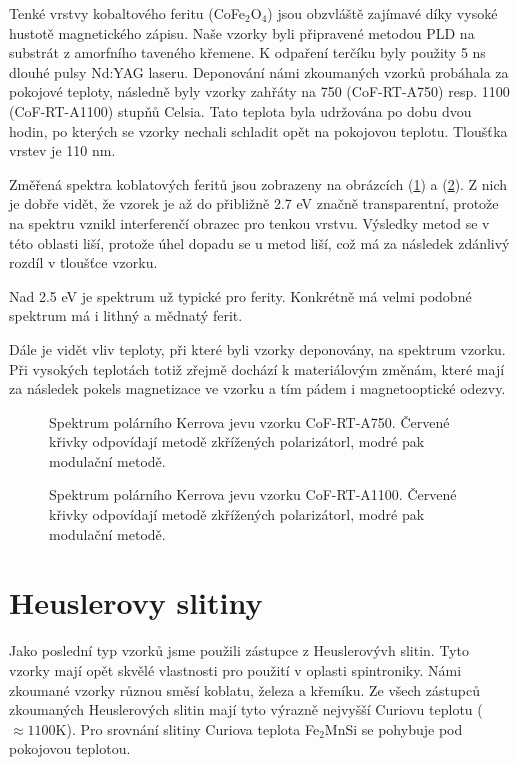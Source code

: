 Tenké vrstvy kobaltového feritu (CoFe$_2$O$_4$) jsou obzvláště zajímavé díky vysoké hustotě magnetického zápisu.
Naše vzorky byli připravené metodou PLD na substrát z amorfního taveného křemene. K odpaření terčíku byly použity 5 ns dlouhé pulsy Nd:YAG laseru. 
Deponování námi zkoumaných vzorků probáhala za pokojové teploty, následně byly vzorky zahřáty na 750 (CoF-RT-A750) resp. 1100 (CoF-RT-A1100) 
stupňů Celsia. Tato teplota byla udržována po dobu dvou hodin, po kterých se vzorky nechali schladit opět na pokojovou teplotu. Tloušťka vrstev je 110 nm.

Změřená spektra koblatových feritů jsou zobrazeny na obrázcích (\ref{sCoF-RT-A750}) a (\ref{sCoF-RT-A1100}). Z nich je dobře vidět, že vzorek je až do přibližně 2.7 eV značně transparentní, protože na spektru vznikl interferenčí obrazec pro tenkou vrstvu. Výsledky metod se v této oblasti liší, protože úhel dopadu se u metod liší, což má za následek zdánlivý rozdíl 
v tloušťce vzorku. 

Nad 2.5 eV je spektrum už typické pro ferity. Konkrétně má velmi podobné spektrum má i lithný a mědnatý ferit. \cite{ferity} 

Dále je vidět vliv teploty, při které byli vzorky deponovány, na spektrum vzorku. Při vysokých teplotách totiž zřejmě dochází k materiálovým změnám, které mají za následek pokels magnetizace ve vzorku a tím pádem i magnetooptické odezvy.


\begin{figure}

\caption{Spektrum polárního Kerrova jevu vzorku CoF-RT-A750. Červené křivky odpovídají metodě zkřížených polarizátorl, modré pak modulační metodě.}
\label{sCoF-RT-A750}
\end{figure}

\begin{figure}

\caption{Spektrum polárního Kerrova jevu vzorku CoF-RT-A1100. Červené křivky odpovídají metodě zkřížených polarizátorl, modré pak modulační metodě.}
\label{sCoF-RT-A1100}
\end{figure}

\section{Heuslerovy slitiny}
Jako poslední typ vzorků jsme použili zástupce z Heuslerovývh slitin. Tyto vzorky mají opět 
skvělé vlastnosti pro použití v oplasti spintroniky.  Námi zkoumané vzorky různou směsí koblatu, 
železa a křemíku. Ze všech zástupců zkoumaných Heuslerových slitin mají tyto výrazně nejvyšší Curiovu 
teplotu ($\approx 1100$K). Pro srovnání slitiny Curiova teplota Fe$_2$MnSi se pohybuje pod pokojovou teplotou.

